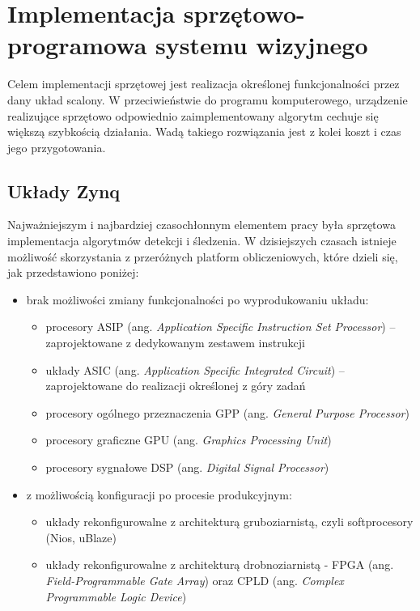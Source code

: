 \chapter{Implementacja sprzętowo-programowa systemu wizyjnego}

Celem implementacji sprzętowej jest realizacja określonej funkcjonalności przez dany układ scalony. W przeciwieństwie do programu komputerowego, urządzenie realizujące sprzętowo odpowiednio zaimplementowany algorytm cechuje się większą szybkością działania. Wadą takiego rozwiązania jest z kolei koszt i czas jego przygotowania.

\section{Układy Zynq}

Najważniejszym i najbardziej czasochłonnym elementem pracy była sprzętowa implementacja algorytmów detekcji i śledzenia. %
W dzisiejszych czasach istnieje możliwość skorzystania z przeróżnych platform obliczeniowych, które dzieli się, jak przedstawiono poniżej:
\begin{itemize}
	\item brak możliwości zmiany funkcjonalności po wyprodukowaniu układu:
	\begin{itemize}
		\item procesory ASIP (ang. \textit{Application Specific Instruction Set Processor}) -- zaprojektowane z dedykowanym zestawem instrukcji		
		\item układy ASIC (ang. \textit{Application Specific Integrated Circuit}) -- zaprojektowane do realizacji określonej z góry zadań
		\item procesory ogólnego przeznaczenia GPP (ang. \textit{General Purpose Processor}) %
		\item procesory graficzne GPU (ang. \textit{Graphics Processing Unit})
		\item procesory sygnałowe DSP (ang. \textit{Digital Signal Processor})
	\end{itemize}
	\item z możliwością konfiguracji po procesie produkcyjnym:
	\begin{itemize} 
		\item układy rekonfigurowalne z architekturą gruboziarnistą,  czyli softprocesory (Nios, uBlaze)%
		\item układy rekonfigurowalne z architekturą drobnoziarnistą - FPGA (ang. \textit{Field-Programmable Gate Array}) oraz CPLD (ang. \textit{Complex Programmable Logic Device})
	\end{itemize}
\end{itemize}

